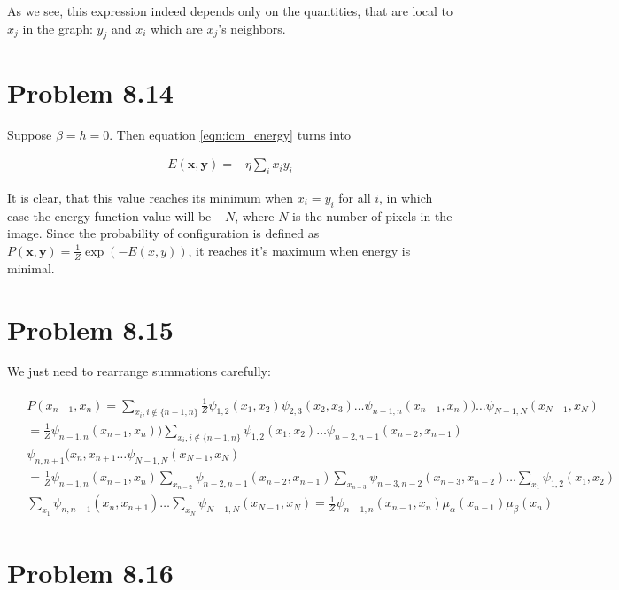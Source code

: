 \documentclass[fleqn]{article}
\begin{document}
As we see, this expression indeed depends only on the quantities, that are local to $x_j$ in the graph: $y_j$ and $x_i$ which are $x_j$'s neighbors. 

\section*{Problem 8.14}

Suppose $\beta = h = 0$. Then equation  \ref{eqn:icm_energy} turns into 

\begin{align}
	E(\boldsymbol{x},\boldsymbol{y}) = -  \eta \sum\limits_{i} x_iy_i
\end{align}

It is clear, that this value reaches its minimum when $x_i = y_i$ for all $i$, in which case the energy function value will be $-N$, where $N$ is the number of pixels in the image. Since the probability of configuration is defined as $P(\boldsymbol x,\boldsymbol y) = \frac{1}{Z}\exp(-E(x,y))$, it reaches it's maximum when energy is minimal.

\section*{Problem 8.15}

We just need to rearrange summations carefully:

\begin{align}
	\begin{split}
& P(x_{n-1},x_n) = \sum\limits_{x_i, i \notin\{n-1,n\}}\frac{1}{Z}\psi_{1,2}(x_1,x_2)\psi_{2,3}(x_2,x_3)\ldots\psi_{n-1,n}(x_{n-1},x_n))\ldots\psi_{N-1,N}(x_{N-1},x_N) \\& = \frac{1}{Z}\psi_{n-1,n}(x_{n-1},x_n)) \sum\limits_{x_i, i \notin\{n-1,n\}}\psi_{1,2}(x_1,x_2)\ldots\psi_{n-2,n-1}(x_{n-2},x_{n-1})\\&\psi_{n,n+1}(x_{n},x_{n+1} \ldots\psi_{N-1,N}(x_{N-1},x_N) \\&=  \frac{1}{Z}\psi_{n-1,n}(x_{n-1},x_n) \sum\limits_{x_{n-2}}\psi_{n-2,n-1}(x_{n-2},x_{n-1})
\sum\limits_{x_{n-3}}\psi_{n-3,n-2}(x_{n-3},x_{n-2})\ldots\sum\limits_{x_{1}}\psi_{1,2}(x_{1},x_{2})\\&\sum\limits_{x_{1}}\psi_{n,n+1}(x_{n},x_{n+1})\ldots	\sum\limits_{x_{N}}\psi_{N-1,N}(x_{N-1},x_{N})	=  \frac{1}{Z}\psi_{n-1,n}(x_{n-1},x_n)\mu_\alpha(x_{n-1})\mu_\beta(x_n)
\end{split}
\end{align}

\section*{Problem 8.16}
\end{document}

